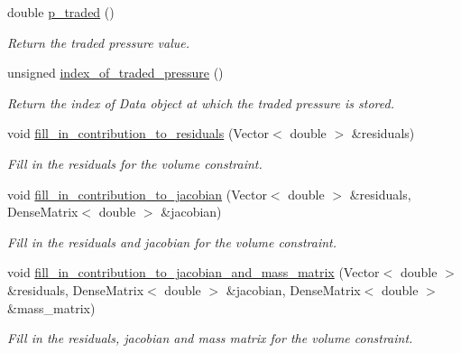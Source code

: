 \begin{DoxyCompactItemize}
double \hyperlink{classoomph_1_1VolumeConstraintElement_aab138c0a3af1e72089d5bed31a633974}{p\+\_\+traded} ()
\begin{DoxyCompactList}\small\item\em Return the traded pressure value. \end{DoxyCompactList}\item 
unsigned \hyperlink{classoomph_1_1VolumeConstraintElement_ada831157effca052df0fae723c21c426}{index\+\_\+of\+\_\+traded\+\_\+pressure} ()
\begin{DoxyCompactList}\small\item\em Return the index of Data object at which the traded pressure is stored. \end{DoxyCompactList}\item 
void \hyperlink{classoomph_1_1VolumeConstraintElement_a15162ac88c571496cc4f9ab5afa51c52}{fill\+\_\+in\+\_\+contribution\+\_\+to\+\_\+residuals} (Vector$<$ double $>$ \&residuals)
\begin{DoxyCompactList}\small\item\em Fill in the residuals for the volume constraint. \end{DoxyCompactList}\item 
void \hyperlink{classoomph_1_1VolumeConstraintElement_a725474b173e3887f5f7e025acf768b28}{fill\+\_\+in\+\_\+contribution\+\_\+to\+\_\+jacobian} (Vector$<$ double $>$ \&residuals, Dense\+Matrix$<$ double $>$ \&jacobian)
\begin{DoxyCompactList}\small\item\em Fill in the residuals and jacobian for the volume constraint. \end{DoxyCompactList}\item 
void \hyperlink{classoomph_1_1VolumeConstraintElement_af2a5a59f7fa5f2570d2d490f3610de61}{fill\+\_\+in\+\_\+contribution\+\_\+to\+\_\+jacobian\+\_\+and\+\_\+mass\+\_\+matrix} (Vector$<$ double $>$ \&residuals, Dense\+Matrix$<$ double $>$ \&jacobian, Dense\+Matrix$<$ double $>$ \&mass\+\_\+matrix)
\begin{DoxyCompactList}\small\item\em Fill in the residuals, jacobian and mass matrix for the volume constraint. \end{DoxyCompactList}\end{DoxyCompactItemize}
